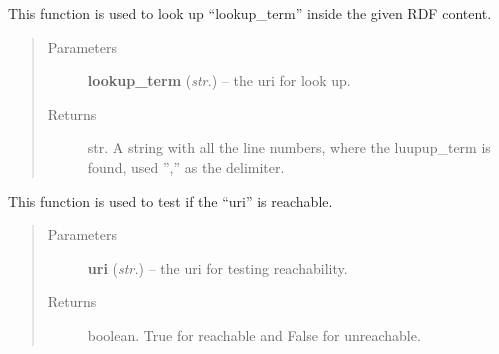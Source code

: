 \documentclass[letterpaper,10pt,english]{sphinxmanual}
\begin{document}
\begin{fulllineitems}
\begin{fulllineitems}
\label{api_ref:extractor.Extractor.get_lines}
This function is used to look up ``lookup\_term'' inside the given RDF content.
\begin{quote}\begin{description}
\item[{Parameters}] \leavevmode
\textbf{lookup\_term} (\emph{str.}) -- the uri for look up.

\item[{Returns}] \leavevmode
str. A string with all the line numbers, where the luupup\_term is found,
used '','' as the delimiter.

\end{description}\end{quote}

\end{fulllineitems}


\begin{fulllineitems}
\label{api_ref:extractor.Extractor.testUri}
This function is used to test if the ``uri'' is reachable.
\begin{quote}\begin{description}
\item[{Parameters}] \leavevmode
\textbf{uri} (\emph{str.}) -- the uri for testing reachability.

\item[{Returns}] \leavevmode
boolean. True for reachable and False for unreachable.

\end{description}\end{quote}

\end{fulllineitems}


\end{fulllineitems}

\end{document}
